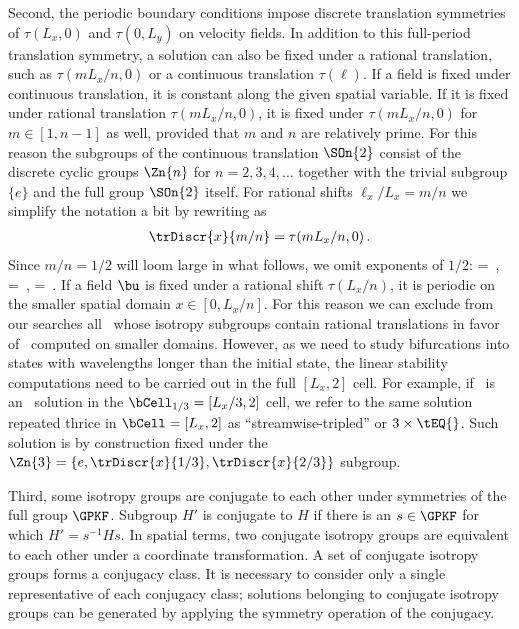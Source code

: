 Second, the periodic boundary conditions impose discrete
translation symmetries of $\tau(L_x, 0)$ and $\tau(0, L_y)$ on
velocity fields. In addition to this full-period translation symmetry,
a solution can also be fixed under a rational translation, such as
$\tau(m L_x/n, 0)$ or a continuous translation $\tau(\ell)$.
If a field is fixed under continuous translation, it is
constant along the given spatial variable. If it is fixed under rational
translation $\tau(m L_x/n, 0)$, it is fixed under $\tau(m L_x/n,
0)$ for $m \in [1, n-1]$ as well, provided that $m$ and $n$ are
relatively prime. For this reason the subgroups of the
continuous translation $\SOn{2}$ consist of the discrete cyclic groups
$\Zn{n}$ for $n=2,3,4,\ldots$ together with the trivial subgroup $\{e\}$
and the full group $\SOn{2}$ itself. For rational
shifts $\ell_x/L_x = m/n$ we simplify the notation a bit by rewriting
 as
\begin{align}
\trDiscr{x}{m/n} = \tau(m L_x/n, 0)
\,.
\label{translDisc}
\end{align}
Since $m/n = 1/2$ will loom large in what follows, we omit exponents of $1/2$:
\beq
     = 
    \,,\;
     = 
    \,,\;
     =  
\,.
\label{tauHalf}
\eeq
If a field $\bu$ is fixed under a rational shift $\tau(L_x/n)$,
it is periodic on the smaller spatial domain $x \in [0,L_x/n]$.
For this reason we can exclude from our searches all \eqv\
whose isotropy subgroups contain
rational translations in favor of \eqva\ computed on smaller domains.
However, as we need to study bifurcations into
states with wavelengths longer than the initial state,
the linear stability computations
need to be carried out in the full $[L_x,2]$ cell.
For example, if \tEQ{}\ is an \eqv\ solution in the
$\bCell_{1/3}= [L_x/3,2]$ cell, we refer to the
same solution repeated thrice in $\bCell = [L_x,2]$
as ``streamwise-tripled'' or
$3 \times \tEQ{}$. Such solution is by construction fixed under the
$\Zn{3} = \{e,\trDiscr{x}{1/3},\trDiscr{x}{2/3}\}$ subgroup.


Third, some isotropy groups are conjugate to each other under symmetries
of the full group $\GPKF$. Subgroup $H'$ is conjugate to $H$ if there is
an $s \in \GPKF$ for which $H' = s^{-1} H s$. In spatial terms, two
conjugate isotropy groups are equivalent to each other under a coordinate
transformation. A set of conjugate isotropy groups forms a conjugacy
class. It is necessary to consider only a single representative of each
conjugacy class; solutions belonging to conjugate isotropy groups can be
generated by applying the symmetry operation of the conjugacy.

